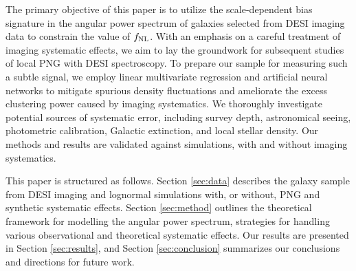 The primary objective of this paper is to utilize the scale-dependent bias signature in the angular power spectrum of galaxies selected from DESI imaging data to constrain the value of $f_{\rm NL}$. With an emphasis on a careful treatment of imaging systematic effects, we aim to lay the groundwork for subsequent studies of local PNG with DESI spectroscopy. To prepare our sample for measuring such a subtle signal, we employ linear multivariate regression and artificial neural networks to mitigate spurious density fluctuations and ameliorate the excess clustering power caused by imaging systematics. We thoroughly investigate potential sources of systematic error, including survey depth, astronomical seeing, photometric calibration, Galactic extinction, and local stellar density. Our methods and results are validated against simulations, with and without imaging systematics.

This paper is structured as follows. Section \ref{sec:data} describes the galaxy sample from DESI imaging and lognormal simulations with, or without, PNG and synthetic systematic effects. Section \ref{sec:method} outlines the theoretical framework for modelling the angular power spectrum,  strategies for handling various observational and theoretical systematic effects. Our results are presented in Section \ref{sec:results}, and Section \ref{sec:conclusion} summarizes our conclusions and directions for future work.